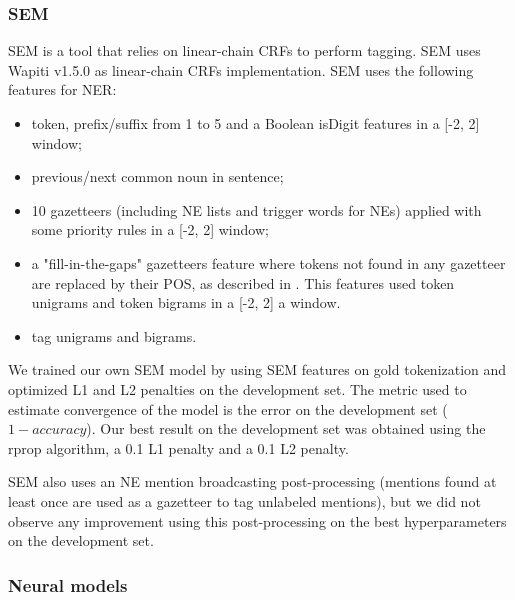 \subsubsection{SEM}
SEM \cite{dupont-2017-exploration} is a tool that relies on linear-chain CRFs \cite{lafferty-etal-2001-conditional} to perform tagging. SEM uses Wapiti \cite{lavergne-etal-2010-practical} v1.5.0 as linear-chain CRFs implementation. SEM uses the following features for NER:
\begin{itemize}
    \item token, prefix/suffix from 1 to 5 and a Boolean isDigit features in a [-2, 2] window;
    \item previous/next common noun in sentence;
    \item 10 gazetteers (including NE lists and trigger words for NEs) applied with some priority rules in a [-2, 2] window;
    \item a "fill-in-the-gaps" gazetteers feature where tokens not found in any gazetteer are replaced by their POS, as described in \cite{raymond-fayolle-2010-reconnaissance}. This features used token unigrams and token bigrams in a [-2, 2] a window.
    \item tag unigrams and bigrams.
\end{itemize}

We trained our own SEM model by using SEM features on gold tokenization and optimized L1 and L2 penalties on the development set. The metric used to estimate convergence of the model is the error on the development set ($1 - accuracy$). Our best result on the development set was obtained using the rprop algorithm, a 0.1 L1 penalty and a 0.1 L2 penalty.

SEM also uses an NE mention broadcasting post-processing (mentions found at least once are used as a gazetteer to tag unlabeled mentions), but we did not observe any improvement using this post-processing on the best hyperparameters on the development set.


\subsubsection{Neural models}

